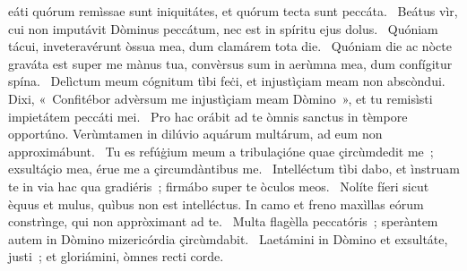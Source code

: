 \psalmChapterWithInscription{}
{ }
{%
eáti quórum remìssae sunt iniquitátes, et quórum tecta sunt peccáta. 
~Beátus vìr, cui non imputávit Dòminus peccátum, nec est in spíritu ejus dolus. 
~Quóniam tácui, inveteravérunt òssua mea, dum clamárem tota die. 
~Quóniam die ac nòcte graváta est super me mànus tua, convèrsus sum in aerùmna mea, dum confígitur spína. 
~Delìctum meum cógnitum tìbi feċi, et injustìçiam meam non abscòndui. Dixi, «~Confitébor advèrsum me injustìçiam meam Dòmino~», et tu remisìsti impietátem peccáti mei. 
~Pro hac orábit ad te òmnis sanctus in tèmpore opportúno. Verùmtamen in dilúvio aquárum multárum, ad eum non approximábunt. 
~Tu es refúġium meum a tribulaçióne quae çircùmdedit me~; exsultáçio mea, érue me a çircumdàntibus me. 
~Intelléctum tìbi dabo, et ìnstruam te in via hac qua gradiéris~; firmábo super te òculos meos. 
~Nolíte fíeri sicut èquus et mulus, quìbus non est intelléctus. In camo et freno maxìllas eórum constrìnge, qui non appròximant ad te. 
~Multa flagèlla peccatóris~; speràntem autem in Dòmino mizericórdia çircùmdabit. 
~Laetámini in Dòmino et exsultáte, justi~; et gloriámini, òmnes recti corde. 
}
